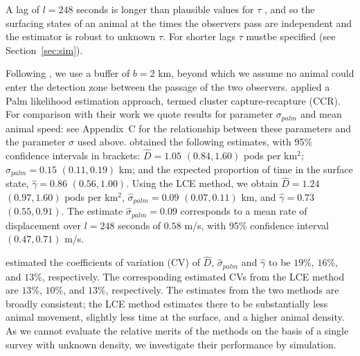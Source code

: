 \documentclass[useAMS, usenatbib, referee]{biom}\usepackage[]{graphicx}\usepackage[]{color}
\begin{document}
A lag of $l=248$ seconds is longer than plausible values for $\tau$ \citep{Stevenson+al:19}, and so the surfacing states of an animal at the times the observers pass are independent and the estimator is robust to unknown $\tau$. For shorter lags $\tau$ mustbe specified (see Section~\ref{sec:sim}).





Following \cite{Stevenson+al:19}, we use a buffer of $b=2$ km, beyond which we assume no animal could enter the detection zone between the passage of the two observers.  \cite{Stevenson+al:19} applied a Palm likelihood estimation approach, termed cluster capture-recapture (CCR).
For comparison with their work we quote results for parameter $\sigma_{palm}$ and mean animal speed: see Appendix~C for the relationship between these parameters and the parameter $\sigma$ used above. \cite{Stevenson+al:19} obtained the following estimates, with 95\% confidence intervals in brackets: $\hat{D}=1.05$ $(0.84, 1.60)$ pods per km$^2$; $\hat{\sigma}_{palm}=0.15$ $(0.11, 0.19)$ km; and the expected proportion of time in the surface state, $\hat{\gamma}=0.86$ $(0.56, 1.00)$. Using the LCE method, we obtain $\hat{D}=1.24$ $(0.97, 1.60)$ pods per km$^2$, $\hat{\sigma}_{palm}=0.09$ $(0.07, 0.11)$ km, and $\hat{\gamma}=0.73$ $(0.55, 0.91)$. The estimate $\hat{\sigma}_{palm}=0.09$ corresponds to a mean rate of displacement over $l=248$ seconds of $0.58$ m/s, with 95\% confidence interval $(0.47, 0.71)$ m/s.

\cite{Stevenson+al:19} estimated the coefficients of variation (CV) of $\hat{D}$, $\hat{\sigma}_{palm}$ and $\hat{\gamma}$ to be $19$\%, $16$\%, and $13$\%, respectively. The corresponding estimated CVs from the LCE method are $13$\%, $10$\%, and $13$\%, respectively. The estimates from the two methods are broadly consistent; the LCE method estimates there to be substantially less animal movement, slightly less time at the surface, and a higher animal density. As we cannot evaluate the relative merits of the methods on the basis of a single survey with unknown density, we investigate their performance by simulation.
\end{document}
